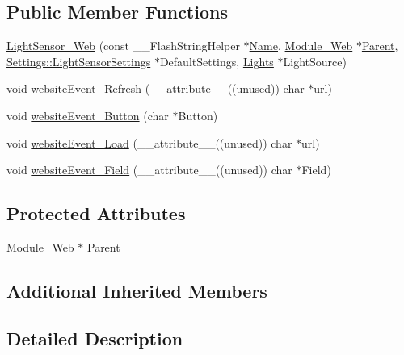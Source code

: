\subsection*{Public Member Functions}
\begin{DoxyCompactItemize}
\item 
\hyperlink{class_light_sensor___web_a3ebeb8eb8a73bc3d9bc61dc31f668280}{Light\+Sensor\+\_\+\+Web} (const \+\_\+\+\_\+\+Flash\+String\+Helper $\ast$\hyperlink{class_common_aeea91a726dbe988e515057b32ba0726f}{Name}, \hyperlink{class_module___web}{Module\+\_\+\+Web} $\ast$\hyperlink{class_light_sensor___web_a742b224aefe383be1a32ae97b5bb1fcc}{Parent}, \hyperlink{struct_settings_1_1_light_sensor_settings}{Settings\+::\+Light\+Sensor\+Settings} $\ast$Default\+Settings, \hyperlink{class_lights}{Lights} $\ast$Light\+Source)
\item 
void \hyperlink{class_light_sensor___web_a6afe75f4f6cec3dc5f44454e23da1f8a}{website\+Event\+\_\+\+Refresh} (\+\_\+\+\_\+attribute\+\_\+\+\_\+((unused)) char $\ast$url)
\item 
void \hyperlink{class_light_sensor___web_abedb4cd4454f322ebbd7c3753bcd2a73}{website\+Event\+\_\+\+Button} (char $\ast$Button)
\item 
void \hyperlink{class_light_sensor___web_ac69aec904a72b3c37e9895f6e1d5a848}{website\+Event\+\_\+\+Load} (\+\_\+\+\_\+attribute\+\_\+\+\_\+((unused)) char $\ast$url)
\item 
void \hyperlink{class_light_sensor___web_af16ca5f334562e0b66ffe14ec0274c52}{website\+Event\+\_\+\+Field} (\+\_\+\+\_\+attribute\+\_\+\+\_\+((unused)) char $\ast$Field)
\end{DoxyCompactItemize}
\subsection*{Protected Attributes}
\begin{DoxyCompactItemize}
\item 
\hyperlink{class_module___web}{Module\+\_\+\+Web} $\ast$ \hyperlink{class_light_sensor___web_a742b224aefe383be1a32ae97b5bb1fcc}{Parent}
\end{DoxyCompactItemize}
\subsection*{Additional Inherited Members}


\subsection{Detailed Description}


